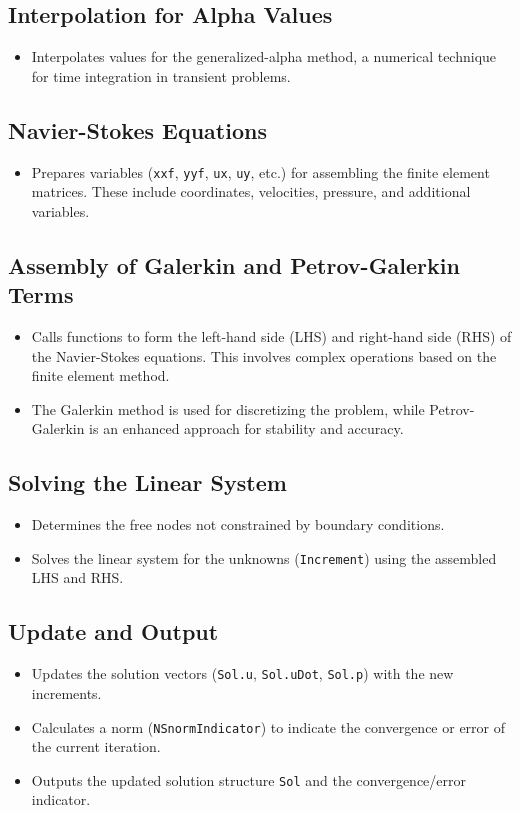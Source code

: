 \documentclass[a4paper,12pt]{article} %
\begin{document}
\subsection*{Interpolation for Alpha Values}
\begin{itemize}
    \item Interpolates values for the generalized-alpha method, a numerical technique for time integration in transient problems.
\end{itemize}

\subsection*{Navier-Stokes Equations}
\begin{itemize}
    \item Prepares variables (\texttt{xxf}, \texttt{yyf}, \texttt{ux}, \texttt{uy}, etc.) for assembling the finite element matrices. These include coordinates, velocities, pressure, and additional variables.
\end{itemize}

\subsection*{Assembly of Galerkin and Petrov-Galerkin Terms}
\begin{itemize}
    \item Calls functions to form the left-hand side (LHS) and right-hand side (RHS) of the Navier-Stokes equations. This involves complex operations based on the finite element method.
    \item The Galerkin method is used for discretizing the problem, while Petrov-Galerkin is an enhanced approach for stability and accuracy.
\end{itemize}

\subsection*{Solving the Linear System}
\begin{itemize}
    \item Determines the free nodes not constrained by boundary conditions.
    \item Solves the linear system for the unknowns (\texttt{Increment}) using the assembled LHS and RHS.
\end{itemize}

\subsection*{Update and Output}
\begin{itemize}
    \item Updates the solution vectors (\texttt{Sol.u}, \texttt{Sol.uDot}, \texttt{Sol.p}) with the new increments.
    \item Calculates a norm (\texttt{NSnormIndicator}) to indicate the convergence or error of the current iteration.
    \item Outputs the updated solution structure \texttt{Sol} and the convergence/error indicator.
\end{itemize}
\end{document}
